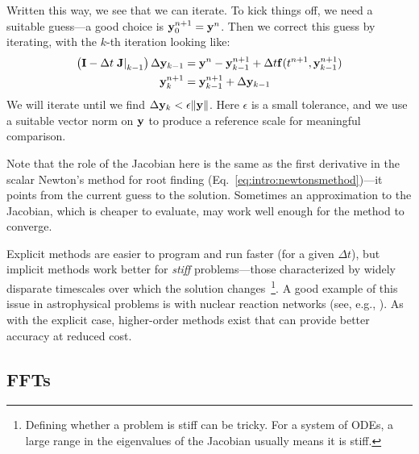 Written this way, we see that we can iterate.  To kick things off, we need
a suitable guess---a good choice is ${\bf y}^{n+1}_0 = {\bf y}^n$.   Then
we correct this guess by iterating, with the $k$-th iteration looking like:
\begin{align}
  \left ({\bf I} - \Delta t \left . {\bf J} \right |_{k-1} \right ) \Delta {\bf y}_{k-1} &=
        {\bf y}^n - {\bf y}_{k-1}^{n+1} + \Delta t {\bf f}(t^{n+1}, {\bf y}^{n+1}_{k-1}) \\
  {\bf y}^{n+1}_k &= {\bf y}^{n+1}_{k-1} + \Delta {\bf y}_{k-1}
\end{align}
We will iterate until we find $\Delta {\bf y}_k < \epsilon \| {\bf y} \|$.
Here $\epsilon$ is a small tolerance, and we use a suitable vector norm on ${\bf y}$
to produce a reference scale for meaningful comparison.  

Note that the role of the Jacobian here is the same as the first
derivative in the scalar Newton's method for root finding
(Eq.~\ref{eq:intro:newtonsmethod})---it points from the current guess
to the solution.  Sometimes an approximation to the Jacobian, which is
cheaper to evaluate, may work well enough for the method to converge.

Explicit methods are easier to program and run faster (for a given $
\Delta t$), but implicit methods work better for {\em stiff}
problems---those characterized by widely disparate timescales over
which the solution changes~\cite{byrnehindmarsh}\footnote{Defining
  whether a problem is stiff can be tricky.  For a system of ODEs, a
  large range in the eigenvalues of the Jacobian usually means it is
  stiff.}.  A good example of this issue in astrophysical problems is
with nuclear reaction networks (see, e.g., \cite{timmes_networks}).
As with the explicit case, higher-order methods exist that can provide
better accuracy at reduced cost.



\subsection{FFTs}




